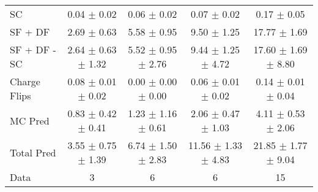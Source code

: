 \begin{tabular}{l|cccc}
                                 SC &  0.04 $\pm$  0.02 &  0.06 $\pm$  0.02 &  0.07 $\pm$  0.02 &  0.17 $\pm$  0.05 \\
                            SF + DF &  2.69 $\pm$  0.63 &  5.58 $\pm$  0.95 &  9.50 $\pm$  1.25 & 17.77 $\pm$  1.69 \\
\hline
                       SF + DF - SC &  2.64 $\pm$  0.63 $\pm$  1.32 &  5.52 $\pm$  0.95 $\pm$  2.76 &  9.44 $\pm$  1.25 $\pm$  4.72 & 17.60 $\pm$  1.69 $\pm$  8.80 \\
\hline\hline
                       Charge Flips &  0.08 $\pm$  0.01 $\pm$  0.02 &  0.00 $\pm$  0.00 $\pm$  0.00 &  0.06 $\pm$  0.01 $\pm$  0.02 &  0.14 $\pm$  0.01 $\pm$  0.04 \\
\hline
                            MC Pred &  0.83 $\pm$  0.42 $\pm$  0.41 &  1.23 $\pm$  1.16 $\pm$  0.61 &  2.06 $\pm$  0.47 $\pm$  1.03 &  4.11 $\pm$  0.53 $\pm$  2.06 \\
\hline
                         Total Pred &  3.55 $\pm$  0.75 $\pm$  1.39 &  6.74 $\pm$  1.50 $\pm$  2.83 & 11.56 $\pm$  1.33 $\pm$  4.83 & 21.85 $\pm$  1.77 $\pm$  9.04 \\
\hline\hline
                               Data &     3 &     6 &     6 &    15 \\
\hline\hline
\end{tabular}

